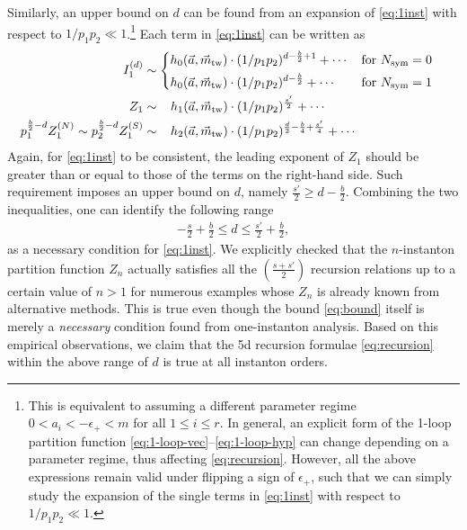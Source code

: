 \documentclass[letterpaper, 11pt]{article}
\newcommand{\nn}{\nonumber}
\def\IZ{\mathbb{Z}}
\def\CN{{\cal N}}
\def\e{\epsilon}
\begin{document}
{Similarly, an upper bound on $d$ can be found from an expansion of \eqref{eq:1inst} with respect to $ 1/p_1p_2 \ll 1$.\footnote{This is equivalent to assuming a different parameter regime $ 0 < a_i < -\e_+ < m$ for all $1\leq i \leq r$. In general, an explicit form of the 1-loop partition function \eqref{eq:1-loop-vec}--\eqref{eq:1-loop-hyp} can change depending on a parameter regime, thus affecting \eqref{eq:recursion}. However, all the above expressions remain valid under flipping a sign of $\epsilon_+$, such that we can simply study the expansion of the single terms in \eqref{eq:1inst} with respect to $ 1/p_1p_2 \ll 1$.} 
Each term in \eqref{eq:1inst} can be written as
\begin{align}
\begin{split}
  I_1^{(d)} &\sim \begin{dcases}
    h_0(\vec{a},  \vec{m}_{\text{tw}})\cdot  (1/p_1p_2)^{d-\frac{b}{2} + 1} + \cdots   &  \text{for }N_\text{sym} = 0\\
    h_0(\vec{a},  \vec{m}_{\text{tw}})\cdot (1/p_1p_2)^{d-\frac{b}{2} } + \cdots    &  \text{for }N_\text{sym} = 1
\end{dcases}
   \\
  Z_1 &\sim  \ \ \,  h_1(\vec{a},  \vec{m}_{\text{tw}})\cdot (1/p_1p_2)^{\frac{s'}{2}}  + \cdots   \\
  p_1^{\frac{b}{2}-d}Z_1^{(N)} \sim  p_2^{\frac{b}{2}-d}  Z^{(S)}_1&\sim \ \ \,  h_2(\vec{a},  \vec{m}_{\text{tw}})\cdot  (1/p_1p_2)^{\frac{d}{2}-\frac{b}{4}+\frac{s'}{4}}   + \cdots   
\end{split}
\end{align}
Again, for \eqref{eq:1inst} to be consistent, the leading exponent of $Z_1$ should be greater than or equal to those of the terms on the right-hand side. Such requirement imposes an upper bound on $d$, namely  $\frac{s'}{2} \geq  d - \frac{b}{2}$.
Combining the two inequalities, one can identify the following range
\begin{align}
  \label{eq:bound}
  -\frac{s}{2} + \frac{b}{2} \leq d \leq \frac{s'}{2} + \frac{b}{2},
\end{align}
as a necessary condition for \eqref{eq:1inst}. 
We explicitly checked that the $n$-instanton partition function $Z_n$ actually satisfies all the $(\frac{s+s'}{2})$ recursion relations up to a certain value of $n > 1$ for numerous examples whose $Z_n$ is already known from alternative methods. 
This is true even though the bound \eqref{eq:bound} itself is merely a \emph{necessary} condition found from one-instanton analysis. 
Based on this empirical observations, we claim that the 5d recursion formulae \eqref{eq:recursion} within the above range of $d$ is true at all instanton orders.

}
\end{document}
